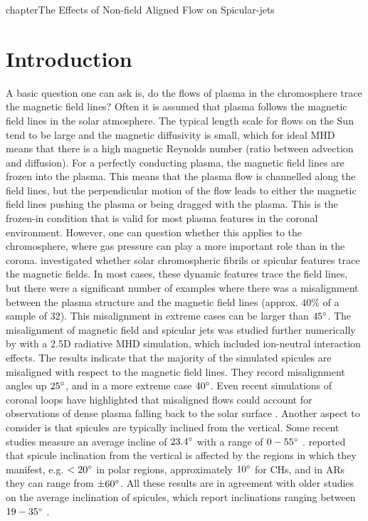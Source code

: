 chapter{The Effects of Non-field Aligned Flow on Spicular-jets}
\section{Introduction}
\label{sec:c3intro}
A basic question one can ask is, do the flows of plasma in the chromosphere trace the magnetic field lines? Often it is assumed that plasma follows the magnetic field lines in the solar atmosphere. The typical length scale for flows on the Sun tend to be large and the magnetic diffusivity is small, which for ideal MHD means that there is a high magnetic Reynolds number (ratio between advection and diffusion). For a perfectly conducting plasma, the magnetic field lines are frozen into the plasma. This means that the plasma flow is channelled along the field lines, but the perpendicular motion of the flow leads to either the magnetic field lines pushing the plasma or being dragged with the plasma. This is the frozen-in condition that is valid for most plasma features in the coronal environment. However, one can question whether this applies to the chromosphere, where gas pressure can play a more important role than in the corona. \cite{delaCruzRodr2011AA527L8D} investigated whether solar chromospheric fibrils or spicular features trace the magnetic fields. In most cases, these dynamic features trace the field lines, but there were a significant number of examples where there was a misalignment between the plasma structure and the magnetic field lines (approx. $40\%$ of a sample of 32). This misalignment in extreme cases can be larger than $45^{\circ}$. The misalignment of magnetic field and spicular jets was studied further numerically by \cite{Mart2016ApJ831L1M} with a 2.5D radiative MHD simulation, which included ion-neutral interaction effects. The results indicate that the majority of the simulated spicules are misaligned with respect to the magnetic field lines. They record misalignment angles up $25^{\circ}$, and in a more extreme case $40^{\circ}$. Even recent simulations of coronal loops have highlighted that misaligned flows could account for observations of dense plasma falling back to the solar surface \citep{Petralia2018AA609A18P}. \np
%
Another aspect to consider is that spicules are typically inclined from the vertical. Some recent studies measure an average incline of $23.4^{\circ}$ with a range of $0-55^{\circ}$ \citep{Pasachoff2009SoPh26059P}. \cite{Tavabi2012JMPh31786T} reported that spicule inclination from the vertical is affected by the regions in which they manifest, e.g. $<20^{\circ}$ in polar regions, approximately $10^{\circ}$ for CHs, and in ARs they can range from $\pm 60^{\circ}$. All these results are in agreement with older studies on the average inclination of spicules, which report inclinations ranging between $19-35 ^{\circ}$ \citep{Beckers1968, Mosher1977SoPh53375M, Heristchi1992SoPh14221H, Tsiropoula2012}. \np
